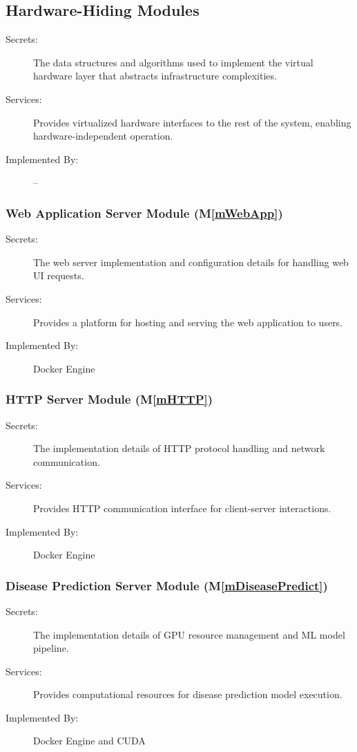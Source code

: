 \documentclass[12pt, titlepage]{article}
\newcommand{\mref}[1]{M\ref{#1}}
\begin{document}
\subsection{Hardware-Hiding Modules}
\begin{description}
\item[Secrets:] The data structures and algorithms used to implement the virtual hardware layer that abstracts infrastructure complexities.
\item[Services:] Provides virtualized hardware interfaces to the rest of the system, enabling hardware-independent operation.
\item[Implemented By:] --
\end{description}

\subsubsection{Web Application Server Module (\mref{mWebApp})}
\begin{description}
\item[Secrets:] The web server implementation and configuration details for handling web UI requests.
\item[Services:] Provides a platform for hosting and serving the web application to users.
\item[Implemented By:] Docker Engine
\end{description}

\subsubsection{HTTP Server Module (\mref{mHTTP})}
\begin{description}
\item[Secrets:] The implementation details of HTTP protocol handling and network communication.
\item[Services:] Provides HTTP communication interface for client-server interactions.
\item[Implemented By:] Docker Engine
\end{description}

\subsubsection{Disease Prediction Server Module (\mref{mDiseasePredict})}
\begin{description}
\item[Secrets:] The implementation details of GPU resource management and ML model pipeline.
\item[Services:] Provides computational resources for disease prediction model execution.
\item[Implemented By:] Docker Engine and CUDA
\end{description}
\end{document}
